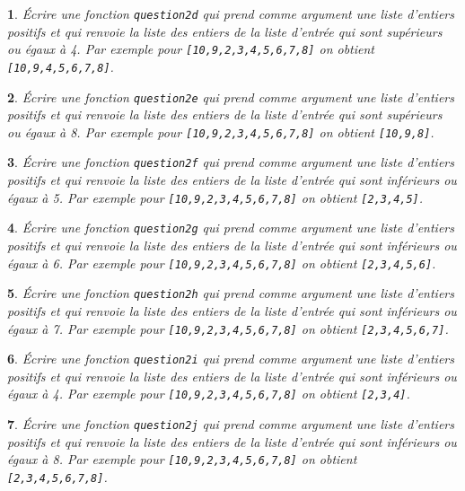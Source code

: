 \documentclass[10pt]{article}
\newtheorem{exi}{}
\newenvironment{exo}{\begin{exi}\em}{\end{exi}}
\begin{document}
\vspace*{-2ex}
\begin{exo}
    Écrire une fonction {\tt question2d} qui prend comme argument une liste d'entiers positifs et qui renvoie la liste des entiers de la liste d'entrée qui sont
supérieurs ou égaux à 4. Par exemple pour \verb+[10,9,2,3,4,5,6,7,8]+
on obtient \verb+[10,9,4,5,6,7,8]+.
\end{exo}
\vspace*{-2ex}
\begin{exo}
    Écrire une fonction {\tt question2e} qui prend comme argument une liste d'entiers positifs et qui renvoie la liste des entiers de la liste d'entrée qui sont
supérieurs ou égaux à 8. Par exemple pour \verb+[10,9,2,3,4,5,6,7,8]+
on obtient \verb+[10,9,8]+.
\end{exo}
\vspace*{-2ex}
\begin{exo}
    Écrire une fonction {\tt question2f} qui prend comme argument une liste d'entiers positifs et qui renvoie la liste des entiers de la liste d'entrée qui sont
inférieurs ou égaux à 5. Par exemple pour \verb+[10,9,2,3,4,5,6,7,8]+
on obtient \verb+[2,3,4,5]+.
\end{exo}
\vspace*{-2ex}
\begin{exo}
    Écrire une fonction {\tt question2g} qui prend comme argument une liste d'entiers positifs et qui renvoie la liste des entiers de la liste d'entrée qui sont
inférieurs ou égaux à 6. Par exemple pour \verb+[10,9,2,3,4,5,6,7,8]+
on obtient \verb+[2,3,4,5,6]+.
\end{exo}
\vspace*{-2ex}
\begin{exo}
    Écrire une fonction {\tt question2h} qui prend comme argument une liste d'entiers positifs et qui renvoie la liste des entiers de la liste d'entrée qui sont
inférieurs ou égaux à 7. Par exemple pour \verb+[10,9,2,3,4,5,6,7,8]+
on obtient \verb+[2,3,4,5,6,7]+.
\end{exo}
\vspace*{-2ex}
\begin{exo}
    Écrire une fonction {\tt question2i} qui prend comme argument une liste d'entiers positifs et qui renvoie la liste des entiers de la liste d'entrée qui sont
inférieurs ou égaux à 4. Par exemple pour \verb+[10,9,2,3,4,5,6,7,8]+
on obtient \verb+[2,3,4]+.
\end{exo}
\vspace*{-2ex}
\begin{exo}
    Écrire une fonction {\tt question2j} qui prend comme argument une liste d'entiers positifs et qui renvoie la liste des entiers de la liste d'entrée qui sont
inférieurs ou égaux à 8. Par exemple pour \verb+[10,9,2,3,4,5,6,7,8]+
on obtient \verb+[2,3,4,5,6,7,8]+.
\end{exo}
\end{document}
